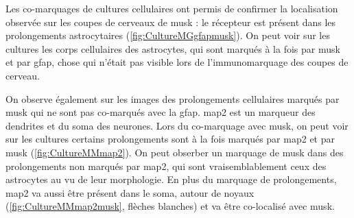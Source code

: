 	Les co-marquages de cultures cellulaires ont permis de confirmer la localisation observée sur les coupes de cerveaux de \gls{musk} : le récepteur est présent dans les prolongements astrocytaires (\cref{fig:CultureMGgfapmusk}). On peut voir sur les cultures les corps cellulaires des astrocytes, qui sont marqués à la fois par \gls{musk} et par \gls{gfap}, chose qui n'était pas visible lors de l'immunomarquage des coupes de cerveau.
	
	On observe également sur les images des prolongements cellulaires marqués par \gls{musk} qui ne sont pas co-marqués avec la \gls{gfap}. \gls{map2} est un marqueur des dendrites et du soma des neurones. Lors du co-marquage avec \gls{musk}, on peut voir sur les cultures certains prolongements sont à la fois marqués par \gls{map2} et par \gls{musk} (\cref{fig:CultureMMmap2}). On peut obserber un marquage de \gls{musk} dans des prolongements non marqués par \gls{map2}, qui sont vraisemblablement ceux des astrocytes au vu de leur morphologie. En plus du marquage de prolongements, \gls{map2} va aussi être présent  dans le soma, autour de noyaux (\cref{fig:CultureMMmap2musk}, flèches blanches) et va être co-localisé avec \gls{musk}. 
	
